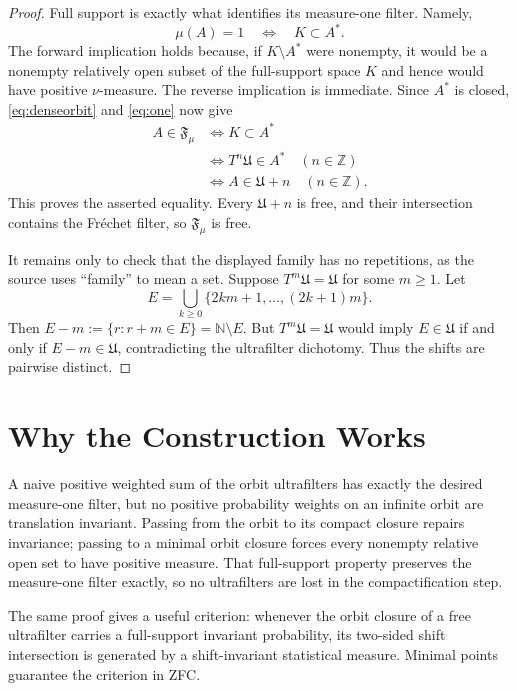 \documentclass[11pt]{article}
\newcommand{\N}{\mathbb N}
\newcommand{\F}{\mathfrak F}
\newcommand{\U}{\mathfrak U}
\begin{document}
\begin{proof}
Full support is exactly what identifies its measure-one filter.  Namely,
\begin{equation}
 \mu(A)=1\quad\Longleftrightarrow\quad K\subset A^*.
 \label{eq:one}
\end{equation}
The forward implication holds because, if $K\setminus A^*$ were nonempty,
it would be a nonempty relatively open subset of the full-support space
$K$ and hence would have positive $\nu$-measure.  The reverse implication
is immediate.  Since $A^*$ is closed, \eqref{eq:denseorbit} and
\eqref{eq:one} now give
\[
 \begin{aligned}
 A\in\F_\mu
 &\Longleftrightarrow K\subset A^*\\
 &\Longleftrightarrow T^n\U\in A^*\quad(n\in\mathbb Z)\\
 &\Longleftrightarrow A\in\U+n\quad(n\in\mathbb Z).
 \end{aligned}
\]
This proves the asserted equality.  Every $\U+n$ is free, and their
intersection contains the Fr\'echet filter, so $\F_\mu$ is free.

It remains only to check that the displayed family has no repetitions, as
the source uses ``family'' to mean a set.  Suppose $T^m\U=\U$ for some
$m\geq1$.  Let
\[
 E=\bigcup_{k\geq0}\{2km+1,\ldots,(2k+1)m\}.
\]
Then $E-m:=\{r:r+m\in E\}=\N\setminus E$.  But $T^m\U=\U$ would imply
$E\in\U$ if and only if $E-m\in\U$, contradicting the ultrafilter
dichotomy.  Thus the shifts are pairwise distinct.
\end{proof}

\section*{Why the Construction Works}

A naive positive weighted sum of the orbit ultrafilters has exactly the
desired measure-one filter, but no positive probability weights on an
infinite orbit are translation invariant.  Passing from the orbit to its
compact closure repairs invariance; passing to a minimal orbit closure
forces every nonempty relative open set to have positive measure.  That
full-support property preserves the measure-one filter exactly, so no
ultrafilters are lost in the compactification step.

The same proof gives a useful criterion: whenever the orbit closure of a
free ultrafilter carries a full-support invariant probability, its
two-sided shift intersection is generated by a shift-invariant statistical
measure.  Minimal points guarantee the criterion in ZFC.
\end{document}
